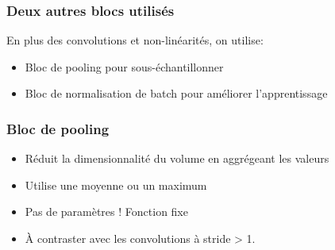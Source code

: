 \documentclass{formation}
\begin{document}
\begin{frame}
  \frametitle{Deux autres blocs utilisés}
  En plus des convolutions et non-linéarités, on utilise:
  \begin{itemize}
  \item Bloc de pooling pour sous-échantillonner
  \item Bloc de normalisation de batch pour améliorer l'apprentissage
  \end{itemize}
\end{frame}

\begin{frame}
  \frametitle{Bloc de pooling}
  \begin{itemize}
  \item Réduit la dimensionnalité du volume en aggrégeant les valeurs
  \item Utilise une moyenne ou un maximum
  \item Pas de paramètres ! Fonction fixe
  \item À contraster avec les convolutions à stride > 1.
  \end{itemize}
\end{frame}
\end{document}
